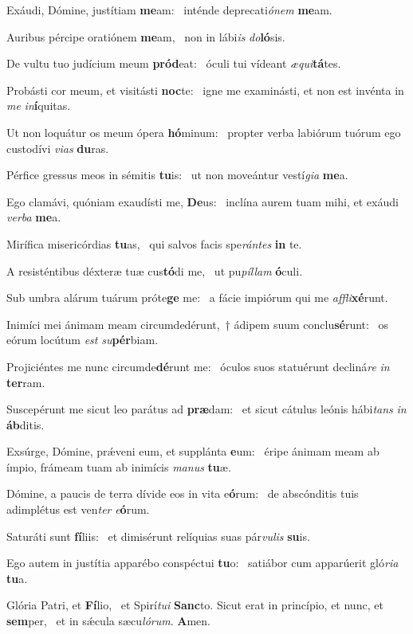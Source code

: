 \item Exáudi, Dómine, justítiam \textbf{me}am:~\psstar{} inténde deprecati\textit{ónem} \textbf{me}am.
\item Auribus pércipe oratiónem \textbf{me}am,~\psstar{} non in lábi\textit{is} \textit{do}\textbf{ló}sis.
\item De vultu tuo judícium meum \textbf{pród}eat:~\psstar{} óculi tui vídeant \textit{æqui}\textbf{tá}tes.
\item Probásti cor meum, et visitásti \textbf{noc}te:~\psstar{} igne me examinásti, et non est invénta in \textit{me} \textit{in}\textbf{í}quitas.
\item Ut non loquátur os meum ópera \textbf{hó}minum:~\psstar{} propter verba labiórum tuórum ego custodívi \textit{vias} \textbf{du}ras.
\item Pérfice gressus meos in sémitis \textbf{tu}is:~\psstar{} ut non moveántur vestí\textit{gia} \textbf{me}a.
\item Ego clamávi, quóniam exaudísti me, \textbf{De}us:~\psstar{} inclína aurem tuam mihi, et exáudi \textit{verba} \textbf{me}a.
\item Mirífica misericórdias \textbf{tu}as,~\psstar{} qui salvos facis spe\textit{rántes} \textbf{in} te.
\item A resisténtibus déxteræ tuæ cus\textbf{tó}di me,~\psstar{} ut pu\textit{píllam} \textbf{ó}culi.
\item Sub umbra alárum tuárum próte\textbf{ge} me:~\psstar{} a fácie impiórum qui me \textit{affli}\textbf{xé}runt.
\item Inimíci mei ánimam meam circumdedérunt,~† ádipem suum conclu\textbf{sé}runt:~\psstar{} os eórum locútum \textit{est} \textit{su}\textbf{pér}biam.
\item Projiciéntes me nunc circumde\textbf{dé}runt me:~\psstar{} óculos suos statuérunt decliná\textit{re} \textit{in} \textbf{ter}ram.
\item Suscepérunt me sicut leo parátus ad \textbf{præ}dam:~\psstar{} et sicut cátulus leónis hábi\textit{tans} \textit{in} \textbf{áb}ditis.
\item Exsúrge, Dómine, prǽveni eum, et supplánta \textbf{e}um:~\psstar{} éripe ánimam meam ab ímpio, frámeam tuam ab inimícis \textit{manus} \textbf{tu}æ.
\item Dómine, a paucis de terra dívide eos in vita e\textbf{ó}rum:~\psstar{} de abscónditis tuis adimplétus est ven\textit{ter} \textit{e}\textbf{ó}rum.
\item Saturáti sunt \textbf{fí}liis:~\psstar{} et dimisérunt relíquias suas pár\textit{vulis} \textbf{su}is.
\item Ego autem in justítia apparébo conspéctui \textbf{tu}o:~\psstar{} satiábor cum apparúerit gló\textit{ria} \textbf{tu}a.
\item Glória Patri, et \textbf{Fí}lio,~\psstar{} et Spirí\textit{tui} \textbf{Sanc}to. Sicut erat in princípio, et nunc, et \textbf{sem}per,~\psstar{} et in sǽcula sæcu\textit{lórum}. \textbf{A}men.
